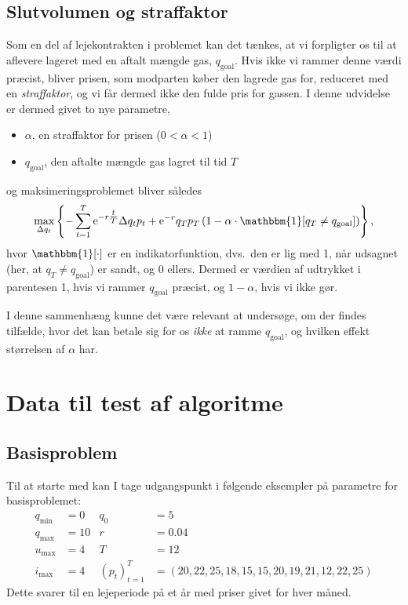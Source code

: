 \documentclass[12pt,oneside,final]{article}
\newcommand{\1}{\mathbbm{1}}
\newcommand{\e}{\mathrm{e}}
\begin{document}
\subsection{Slutvolumen og straffaktor}
Som en del af lejekontrakten i problemet kan det tænkes, at vi forpligter os til at aflevere lageret med en aftalt mængde gas, \(q_{\mathrm{goal}}\).
Hvis ikke vi rammer denne værdi præcist, bliver prisen, som modparten køber den lagrede gas for, reduceret med en \emph{straffaktor}, og vi får dermed ikke den fulde pris for gassen.
I denne udvidelse er dermed givet to nye parametre,
\begin{itemize}
\item \(\alpha\), en straffaktor for prisen (\(0 < \alpha < 1\))
\item \(q_{\mathrm{goal}}\), den aftalte mængde gas lagret til tid \(T\)
\end{itemize}
og maksimeringsproblemet bliver således
\begin{equation}
  \max_{\Delta q_{t}}
  \left\{
    - \sum_{t = 1}^{T} \e^{-r\tfrac{t}{T}} \Delta q_{t} p_{t} + \e^{-r} q_{T}p_{T}
    \left(
      1 - \alpha \cdot \1 [q_{T} \neq q_{\mathrm{goal}}]
    \right)
  \right\} ,
\end{equation}
hvor \(\1[\cdot]\) er en indikatorfunktion, dvs.\ den er lig med 1, når udsagnet (her, at \(q_{T} \neq q_{\mathrm{goal}}\)) er sandt, og 0 ellers.
Dermed er værdien af udtrykket i parentesen 1, hvis vi rammer \(q_{\mathrm{goal}}\) præcist, og \(1 - \alpha\), hvis vi ikke gør.

I denne sammenhæng kunne det være relevant at undersøge, om der findes tilfælde, hvor det kan betale sig for os \emph{ikke} at ramme \(q_{\mathrm{goal}}\), og hvilken effekt størrelsen af \(\alpha\) har.


\clearpage
\section{Data til test af algoritme}

\subsection{Basisproblem}
Til at starte med kan I tage udgangspunkt i følgende eksempler på parametre for basisproblemet:
\begin{align*}
  q_{\min} &= 0 & q_{0} &= 5 \\
  q_{\max} &= 10 & r &= 0.04 \\
  u_{\max} &= 4 &  T &= 12 \\
  i_{\max} &= 4 &  (p_{t})_{t=1}^{T} &= (20, 22, 25, 18, 15, 15, 20, 19, 21, 12, 22, 25)
\end{align*}
Dette svarer til en lejeperiode på et år med priser givet for hver måned.
\end{document}
